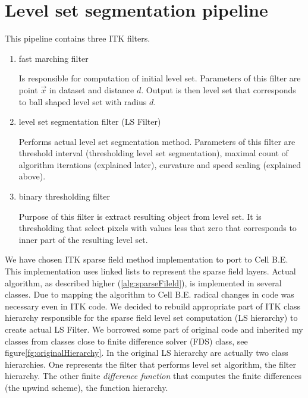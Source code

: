 \section{Level set segmentation pipeline}

This pipeline contains three ITK filters.
\begin{enumerate}
  \item{fast marching filter}
  \par
  Is responsible for computation of initial level set.
Parameters of this filter are point $\vec{x}$ in dataset and distance $d$.
Output is then level set that corresponds to ball shaped level set with radius $d$.

  \item{level set segmentation filter (LS Filter)}
  \par
  Performs actual level set segmentation method.
Parameters of this filter are threshold interval (thresholding level set segmentation),  maximal count of algorithm iterations (explained later), curvature and speed scaling (explained above).

  \item{binary thresholding filter}
  \par
  Purpose of this filter is extract resulting object from level set.
It is thresholding that select pixels with values less that zero that corresponds to inner part of the resulting level set.
\end{enumerate}

We have chosen ITK sparse field method implementation to port to Cell B.E.
This implementation uses linked lists to represent the sparse field layers.
Actual algorithm, as described higher (\ref{alg:sparseFileld}), is implemented in several classes.
Due to mapping the algorithm to Cell B.E. radical changes in code was necessary even in ITK code.
We decided to rebuild appropriate part of ITK class hierarchy responsible for the sparse field level set computation (LS hierarchy) to create actual LS Filter.
We borrowed some part of original code and inherited my classes from classes close to finite difference solver (FDS) class, see figure\ref{fg:originalHierarchy}.
In the original LS hierarchy are actually two class hierarchies.
One represents the filter that performs level set algorithm, the filter hierarchy.
The other finite \emph{difference function} that computes the finite differences (the upwind scheme), the function hierarchy.

